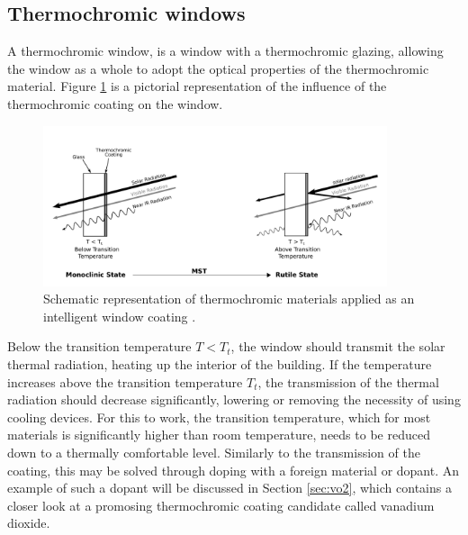 \newpage
\subsection{Thermochromic windows}
A thermochromic window, is a window
with a thermochromic glazing, allowing the window as a whole to adopt the 
optical properties of the thermochromic material. Figure \ref{fig:TCcoating} is a pictorial representation
of the influence of the thermochromic coating on the window. 
%
\begin{figure}[h!]
  \centering
   \includegraphics[width=0.9\textwidth]{Figures/TCcoating2.pdf}
   \caption{Schematic representation of thermochromic materials applied as an 
   intelligent window coating \cite{Kiri2010}.
   }
   \label{fig:TCcoating}
\end{figure}
%
Below the transition temperature $T<T_t$, the window should transmit the solar thermal radiation, heating 
up the interior of the building. If the temperature increases above the transition temperature $T_t$,
the transmission of the thermal radiation should decrease significantly, lowering or removing
the necessity of using cooling devices. 
For this to work, the transition temperature, which for most materials is significantly higher 
than room temperature, needs to be reduced down to a thermally comfortable level. 
Similarly to the transmission of the coating, this may be solved through doping with a foreign
material or dopant. An example of such a dopant will be discussed in Section \ref{sec:vo2},
which contains a closer look at a promosing thermochromic coating candidate called vanadium dioxide.
\\
\\
%
